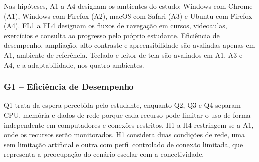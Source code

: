 \documentclass[sigconf, language=english, language=brazilian,natbib=false]{acmart}
\begin{document}
Nas hipóteses, A1 a A4 designam os ambientes do estudo: Windows com
Chrome (A1), Windows com Firefox (A2), macOS com Safari (A3) e Ubuntu
com Firefox (A4). FL1 a FL4 designam os fluxos de navegação em cursos,
videoaulas, exercícios e consulta ao progresso pelo próprio estudante.
Eficiência de desempenho, ampliação, alto contraste e apreensibilidade
são avaliadas apenas em A1, ambiente de referência. Teclado e leitor
de tela são avaliados em A1, A3 e A4, e a adaptabilidade, nos quatro
ambientes.

\providecommand*{\tabrr}{\raggedright\let\\\tabularnewline}

\subsubsection{G1 -- Eficiência de Desempenho}

Q1 trata da espera percebida pelo estudante, enquanto Q2, Q3 e Q4
separam CPU, memória e dados de rede porque cada recurso pode limitar
o uso de forma independente em computadores e conexões restritos.
H1 a H4 restringem-se a A1, onde os recursos serão monitorados.
H1 considera duas condições de rede, uma sem limitação artificial
e outra com perfil controlado de conexão limitada, que representa
a preocupação do cenário escolar com a conectividade.
\end{document}
